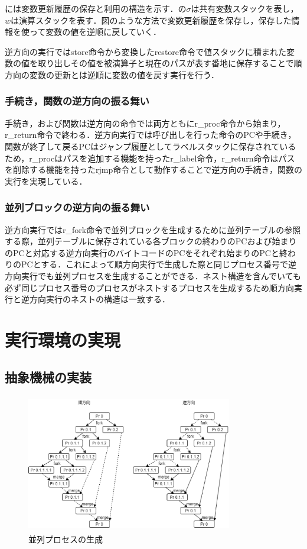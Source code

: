 \documentclass[submit,PRO]{ipsj}
\begin{document}
には変数更新履歴の保存と利用の構造を示す．の$\sigma$は共有変数スタックを表し，$w$は演算スタックを表す．図のような方法で変数更新履歴を保存し，保存した情報を使って変数の値を逆順に戻していく．

逆方向の実行ではstore命令から変換したrestore命令で値スタックに積まれた変数の値を取り出しその値を被演算子と現在のパスが表す番地に保存することで順方向の変数の更新とは逆順に変数の値を戻す実行を行う．

\subsubsection{手続き，関数の逆方向の振る舞い}

手続き，および関数は逆方向の命令では両方ともにr\_proc命令から始まり，r\_return命令で終わる．逆方向実行では呼び出しを行った命令のPCや手続き，関数が終了して戻るPCはジャンプ履歴としてラベルスタックに保存されているため，r\_procはパスを追加する機能を持ったr\_label命令，r\_return命令はパスを削除する機能を持ったrjmp命令として動作することで逆方向の手続き，関数の実行を実現している．

\subsubsection{並列ブロックの逆方向の振る舞い}

逆方向実行ではr\_fork命令で並列ブロックを生成するために並列テーブルの参照する際，並列テーブルに保存されている各ブロックの終わりのPCおよび始まりのPCと対応する逆方向実行のバイトコードのPCをそれぞれ始まりのPCと終わりのPCとする．これによって順方向実行で生成した際と同じプロセス番号で逆方向実行でも並列プロセスを生成することができる．ネスト構造を含んでいても必ず同じプロセス番号のプロセスがネストするプロセスを生成するため順方向実行と逆方向実行のネストの構造は一致する．


\section{実行環境の実現}

\subsection{抽象機械の実装}

\begin{figure}[tb]
\includegraphics[height=6.0cm,width=9.0cm]{parallel.eps}
\caption{並列プロセスの生成}
\label{fig:parallel}
\end{figure}
\end{document}
